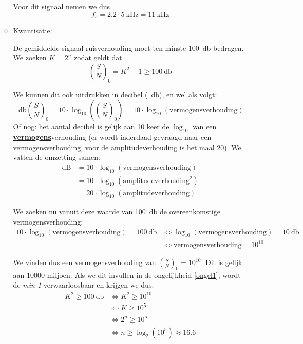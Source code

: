 \documentclass[kulak]{kulakarticle}
\begin{document}
\begin{enumerate}
\begin{itemize}
			Voor dit signaal nemen we dus \[ f_s = 2.2\cdot \SI{5}{\kilo\hertz}=\boxed{\SI{11}{\kilo\hertz}} \]
			\item \underline{Kwantisatie}:

			De gemiddelde signaal-ruisverhouding moet ten minste \SI{100}{\decibel} bedragen. We zoeken \(K=2^n\) zodat geldt dat
			\begin{equation}
				\left(\frac{S}{N}\right)_0=K^2-1\geq \SI{100}{\decibel} \label{ongel1}
			\end{equation}

			We kunnen dit ook uitdrukken in decibel (\SI{}{\decibel}), en wel als volgt: \[\SI{}{\decibel}\left(\frac{S}{N}\right)_0 = 10\cdot \log_{10}\left(\left(\frac{S}{N}\right)_0\right) = 10 \cdot \log_{10}(\text{vermogensverhouding})\] Of nog: het aantal decibel is gelijk aan 10 keer de \( \log_{10} \) van een \underline{\textbf{vermogens}}verhouding (er wordt inderdaad gevraagd naar een vermogensverhouding, voor de amplitudeverhouding is het maal 20). We vatten de omzetting samen:
			\begin{equation*}
				\begin{split}
					\text{dB} &= 10 \cdot \log_{10}(\text{vermogensverhouding}) \\
					&= 10 \cdot \log_{10}(\text{amplitudeverhouding}^2) \\
					&= 20 \cdot \log_{10}(\text{amplitudeverhouding})
				\end{split}
			\end{equation*}

			We zoeken nu vanuit deze waarde van \SI{100}{\decibel} de overeenkomstige vermogensverhouding:
			\begin{equation*}
				\begin{split}
					10 \cdot \log_{10}(\text{vermogensverhouding}) = \SI{100}{\decibel} &\Leftrightarrow \log_{10}(\text{vermogensverhouding}) = \SI{10}{\decibel} \\
					& \Leftrightarrow \text{vermogensverhouding} = 10^{10}
				\end{split}
			\end{equation*}

			We vinden dus een vermogensverhouding van \( \left(\frac{S}{N}\right)_0 = 10^{10} \). Dit is gelijk aan \( 10000 \) miljoen. Als we dit invullen in de ongelijkheid \ref{ongel1}, wordt de \textit{min 1} verwaarloosbaar en krijgen we dus:
			\begin{equation*}
				\begin{split}
					K^2\geq \SI{100}{\decibel} &\Leftrightarrow K^2 \geq 10^{10} \\
					& \Leftrightarrow K \geq 10^5 \\
					& \Leftrightarrow 2^n \geq 10^5 \\
					& \Leftrightarrow n \geq \log_2(10^5)\approx 16.6
				\end{split}
			\end{equation*}


\end{itemize}
\end{enumerate}
\end{document}
